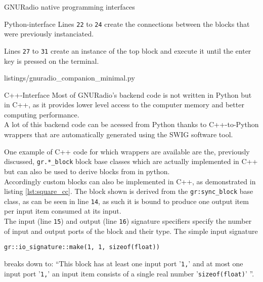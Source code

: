 \begin{subchapter}{GNURadio native programming interfaces}
\begin{subsubchapter}{Python-interface}
    Lines \texttt{22} to \texttt{24} create the connections
    between the blocks that were previously instanciated.

    Lines \texttt{27} to \texttt{31} create an instance of the
    top block and execute it until the enter key is pressed
    on the terminal.

    
                    {listings/gnuradio_companion_minimal.py}

  \end{subsubchapter}

  \begin{subsubchapter}{C++-Interface}
    Most of GNURadio's backend code is not written in Python
    but in C++, as it provides lower level access to the computer
    memory and better computing performance. \\

    A lot of this backend code can be acessed from Python
    thanks to C++-to-Python wrappers that are automatically
    generated using the SWIG \cite{swigweb} software tool.

    One example of C++ code for which wrappers are available
    are the, previously discussed, \texttt{gr.*\_block} block
    base classes which are actually implemented in C++
    but can also be used to derive blocks from in python. \\

    Accordingly custom blocks can also be implemented in
    C++, as demonstrated in listing \ref{lst:square_cc}.
    The block shown is derived from the \texttt{gr:sync\_block}
    base class, as can be seen in line \texttt{14}, as
    such it is bound to produce one output item
    per input item consumed at its input. \\

    The input (line \texttt{15}) and output (line \texttt{16})
    signature specifiers specify the number of input and output
    ports of the block and their type.
    The simple input signature

    \begin{center}
      \texttt{gr::io\_signature::make(1, 1, sizeof(float))}
    \end{center}

    breaks down to: ``This block has at least one input port '\texttt{1,}' and
    at most one input port '\texttt{1,}' an input item consists of a single real
    number '\texttt{sizeof(float)}' ''.


\end{subsubchapter}
\end{subchapter}
